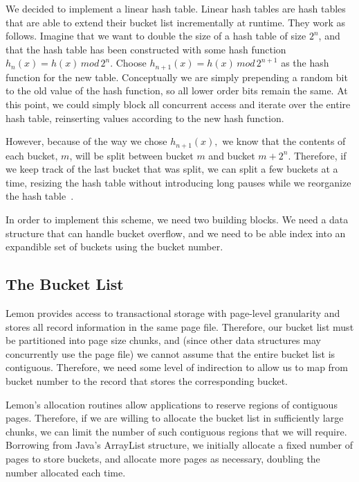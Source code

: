 \documentclass[letterpaper,twocolumn,english]{article}
\newcommand{\yad}{Lemon\xspace}
\begin{document}
We decided to implement a linear hash table.  Linear hash tables are
hash tables that are able to extend their bucket list incrementally at
runtime. They work as follows. Imagine that we want to double the size
of a hash table of size $2^{n}$, and that the hash table has been
constructed with some hash function $h_{n}(x)=h(x)\, mod\,2^{n}$.
Choose $h_{n+1}(x)=h(x)\, mod\,2^{n+1}$ as the hash function for the
new table. Conceptually we are simply prepending a random bit to the
old value of the hash function, so all lower order bits remain the
same. At this point, we could simply block all concurrent access and
iterate over the entire hash table, reinserting values according to
the new hash function.

However, because of the way we chose $h_{n+1}(x),$ we know that the
contents of each bucket, $m$, will be split between bucket $m$ and
bucket $m+2^{n}$. Therefore, if we keep track of the last bucket that
was split, we can split a few buckets at a time, resizing the hash
table without introducing long pauses while we reorganize the hash
table~\cite{lht}. 

In order to implement this scheme, we need two building blocks.  We
need a data structure that can handle bucket overflow, and we need to
be able index into an expandible set of buckets using the bucket
number.

\subsection{The Bucket List}

\yad provides access to transactional storage with page-level
granularity and stores all record information in the same page file.
Therefore, our bucket list must be partitioned into page size chunks,
and (since other data structures may concurrently use the page file)
we cannot assume that the entire bucket list is contiguous.
Therefore, we need some level of indirection to allow us to map from
bucket number to the record that stores the corresponding bucket.

\yad's allocation routines allow applications to reserve regions of
contiguous pages.  Therefore, if we are willing to allocate the bucket
list in sufficiently large chunks, we can limit the number of such
contiguous regions that we will require.  Borrowing from Java's
ArrayList structure, we initially allocate a fixed number of pages to
store buckets, and allocate more pages as necessary, doubling the
number allocated each time.  
\end{document}
